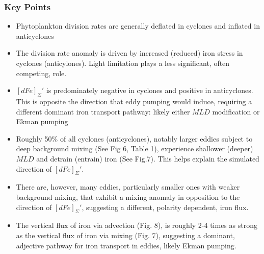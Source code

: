 \subsubsection*{Key Points}
\vspace{5mm}
\begin{itemize}
\item  Phytoplankton division rates are generally deflated in cyclones and inflated in anticyclones 
\item The division rate anomaly is driven by increased (reduced) iron stress in cyclones (anticylones). Light limitation plays a less significant, often competing, role.
\item  $[dFe]_\Sigma'$ is predominately negative in cyclones and positive in anticyclones. This is opposite the direction that eddy pumping would induce, requiring a different dominant iron transport pathway: likely either $MLD$ modification or Ekman pumping
\item Roughly 50\% of all cyclones (anticyclones), notably larger eddies subject to deep background mixing (See Fig 6, Table 1), experience shallower (deeper) $MLD$ and detrain (entrain) iron (See Fig.7). This helps explain the simulated direction of $[dFe]_\Sigma'$.
\item There are, however, many eddies, particularly smaller ones with weaker background mixing, that exhibit a mixing anomaly in opposition to the direction of $[dFe]_\Sigma'$, suggesting a different, polarity dependent, iron flux. 
\item The vertical flux of iron via advection (Fig. 8), is roughly 2-4 times as strong as the vertical flux of iron via mixing (Fig. 7), suggesting a dominant, adjective pathway for iron transport in eddies, likely Ekman pumping. 
\end{itemize}
%

